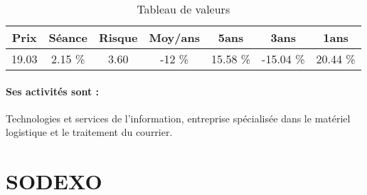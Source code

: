 \documentclass[11pt,a4paper]{report}%
\begin{document}
\begin{table}[H]
  \centering
    \begin{tabular}{|c|c|c|c|c|c|c|}
    \hline
    Prix & Séance & Risque  & Moy/ans & 5ans & 3ans & 1ans \\
    \hline
    19.03 &    2.15 \%    & 3.60 & -12 \% & 15.58 \% & -15.04 \% & 20.44 \% \\
    \hline
    \end{tabular}%
        \label{tab:table_QUADIENT SA}%
      \caption{Tableau de valeurs}
\end{table}%

\paragraph{Ses activités sont : } Technologies et services de l’information, entreprise spécialisée dans le matériel logistique et le traitement du courrier. 
    
    \newpage

\section{SODEXO}
\end{document}
